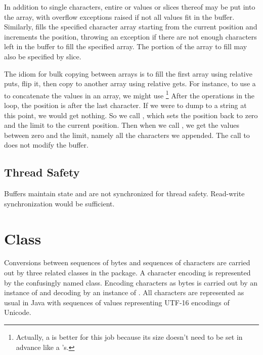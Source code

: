 In addition to single characters, entire  or
 values or slices thereof may be put into the array, with
overflow exceptions raised if not all values fit in the buffer.
Similarly,  fills the specified character array
starting from the current position and increments the position,
throwing an exception if there are not enough characters left in the
buffer to fill the specified array.  The portion of the array to fill
may also be specified by slice.

The idiom for bulk copying between arrays is to fill the first array
using relative puts, flip it, then copy to another array using
relative gets.  For instance, to use a  to concatenate
the values in an array, we might use%
%
\footnote{Actually, a  is better for this job
because its size doesn't need to be set in advance like a
's.}%
%
%
After the  operations in the loop, the position is
after the last character.  If we were to dump to a string at this
point, we would get nothing.  So we call , which
sets the position back to zero and the limit to the current
position.  Then when we call , we get the values
between zero and the limit, namely all the characters we appended.
The call to  does not modify the buffer.

\subsection{Thread Safety}

Buffers maintain state and are not synchronized for thread safety.
Read-write synchronization would be sufficient.

\section{ Class}\label{section:charset}

Conversions between sequences of bytes and sequences of characters are
carried out by three related classes in the 
package.  A character encoding is represented by the confusingly named
 class.  Encoding characters as bytes is carried out by
an instance of  and decoding by an instance of
.  All characters are represented as usual in
Java with sequences of  values representing UTF-16
encodings of Unicode.

